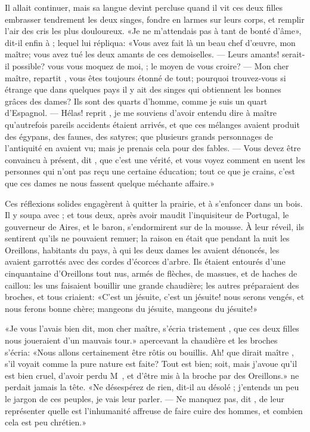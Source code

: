 Il allait continuer, mais sa langue devint percluse quand il vit ces
deux filles embrasser tendrement les deux singes, fondre en larmes sur
leurs corps, et remplir l’air des cris les plus douloureux. «Je ne
m’attendais pas à tant de bonté d’âme», dit-il enfin à ; lequel
lui répliqua: «Vous avez fait là un beau chef d’œuvre, mon maître; vous
avez tué les deux amants de ces demoiselles. — Leurs amants! serait-il
possible? vous vous moquez de moi, ; le moyen de vous croire?
— Mon cher maître, repartit , vous êtes toujours étonné de tout;
pourquoi trouvez-vous si étrange que dans quelques pays il y ait des
singes qui obtiennent les bonnes grâces des dames? Ils sont des quarts
d’homme, comme je suis un quart d’Espagnol. — Hélas! reprit , je
me souviens d’avoir entendu dire à maître  qu’autrefois pareils
accidents étaient arrivés, et que ces mélanges avaient produit des
égypans, des faunes, des satyres; que plusieurs grands personnages de
l’antiquité en avaient vu; mais je prenais cela pour des fables. — Vous
devez être convaincu à présent, dit , que c’est une vérité, et
vous voyez comment en usent les personnes qui n’ont pas reçu une
certaine éducation; tout ce que je crains, c’est que ces dames ne nous
fassent quelque méchante affaire.»

Ces réflexions solides engagèrent  à quitter la prairie, et à
s’enfoncer dans un bois. Il y soupa avec ; et tous deux, après
avoir maudit l’inquisiteur de Portugal, le gouverneur de  Aires,
et le baron, s’endormirent sur de la mousse. À leur réveil, ils
sentirent qu’ils ne pouvaient remuer; la raison en était que pendant la
nuit les Oreillons, habitants du pays, à qui les deux dames les avaient
dénoncés, les avaient garrottés avec des cordes d’écorces d’arbre.
Ils étaient entourés d’une cinquantaine d’Oreillons tout nus, armés de
flèches, de massues, et de haches de caillou: les uns faisaient bouillir
une grande chaudière; les autres préparaient des broches, et tous
criaient: «C’est un jésuite, c’est un jésuite! nous serons vengés, et
nous ferons bonne chère; mangeons du jésuite, mangeons du jésuite!»

«Je vous l’avais bien dit, mon cher maître, s’écria tristement ,
que ces deux filles nous joueraient d’un mauvais tour.» 
apercevant la chaudière et les broches s’écria: «Nous allons
certainement être rôtis ou bouillis. Ah! que dirait maître ,
s’il voyait comme la pure nature est faite? Tout est bien; soit, mais
j’avoue qu’il est bien cruel, d’avoir perdu M~, et
d’être mis à la broche par des Oreillons.»  ne perdait jamais la
tête. «Ne désespérez de rien, dit-il au désolé ; j’entends un peu
le jargon de ces peuples, je vais leur parler. — Ne manquez pas, dit
, de leur représenter quelle est l’inhumanité affreuse de faire
cuire des hommes, et combien cela est peu chrétien.»

